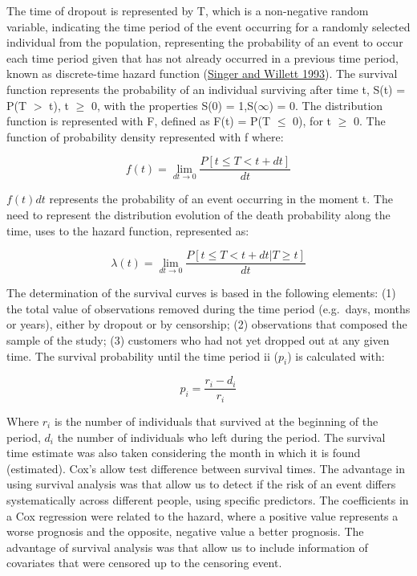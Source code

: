 \documentclass[
  12pt,
]{article}
\begin{document}
The time of dropout is represented by T, which is a non-negative random variable,
indicating the time period of the event occurring for a randomly selected individual
from the population, representing the probability of an event to occur each time period given
that has not already occurred in a previous time period, known as discrete-time hazard function
(\protect\hyperlink{ref-Singer_Willett_1993}{Singer and Willett 1993}).
The survival function represents the probability of an individual surviving after time t,
S(t) = P(T \(>\) t), t \(\geq\) 0, with the properties S(0) = 1,S(\(\infty\)) = 0.
The distribution function is represented with F, defined as F(t) = P(T \(\leq\) 0), for t \(\geq\) 0.
The function of probability density represented with f where:

\begin{equation}
f(t) = \lim_{dt{\to 0}} \frac{P[t \le T < t + dt ]}{dt}
\end{equation}

\(f(t)dt\) represents the probability of an event occurring in the moment t.
The need to represent the distribution evolution of the death probability along the time,
uses to the hazard function, represented as:

\begin{equation}
\lambda(t) = \lim_{dt \to 0} \frac{P[t \le T < t + dt | T \ge t ]}{dt}
\end{equation}

The determination of the survival curves is based in the following elements:
(1) the total value of observations removed during the time period (e.g.~days, months or years),
either by dropout or by censorship;
(2) observations that composed the sample of the study;
(3) customers who had not yet dropped out at any given time.
The survival probability until the time period ii (\(p_i\)) is calculated with:

\begin{equation}
p_i=\frac{r_i-d_i}{r_i}
\end{equation}

Where \(r_i\) is the number of individuals that survived at the beginning of the period,
\(d_i\) the number of individuals who left during the period.
The survival time estimate was also taken considering the month in which it is found (estimated).
Cox's allow test difference between survival times.
The advantage in using survival analysis was that allow us to detect if the risk of an event differs
systematically across different people, using specific predictors.
The coefficients in a Cox regression were related to the hazard, where a positive value
represents a worse prognosis and the opposite, negative value a better prognosis.
The advantage of survival analysis was that allow us to include information of covariates
that were censored up to the censoring event.
\end{document}
